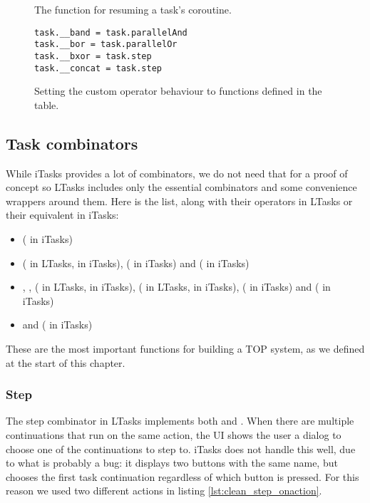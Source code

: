 \begin{figure}[ht]
\centering
\inputminted[linenos, firstline=310, lastline=327]{lua}{code/task.lua}
\vspace{-\baselineskip}
\caption{The  function for resuming a task's coroutine.}
\label{lst:ltasks_task.resume}
\end{figure}

\begin{figure}[ht]
\centering
\begin{verbatim}
task.__band = task.parallelAnd
task.__bor = task.parallelOr
task.__bxor = task.step
task.__concat = task.step
\end{verbatim}
\vspace{-\baselineskip}
\caption{Setting the custom operator behaviour to functions defined in the  table.}
\label{lst:ltasks_operators_definition}
\end{figure}

\subsection{Task combinators}\label{section-ltasks-combinators}
While iTasks provides a lot of combinators, we do not need that for a proof of concept so LTasks includes only the essential combinators and some convenience wrappers around them. Here is the list, along with their operators in LTasks or their equivalent in iTasks:
\begin{itemize}
    \item {} ( in iTasks)
    \item {} (\lua{~} in LTasks, \clean{>>*} in iTasks),  (\clean{>>-} in iTasks) and \linebreak {} ( in iTasks)
    \item {}, ,  (\lua{&} in LTasks, \clean{-&&-} in iTasks),  (\lua{|} in LTasks, \clean{-||-} in iTasks),  (\clean{-||} in iTasks) and  (\clean{||-} in iTasks)
    \item {} and  ( in iTasks)
\end{itemize}

These are the most important functions for building a TOP system, as we defined at the start of this chapter.

\subsubsection{Step}
The step combinator in LTasks implements both  and . When there are multiple continuations that run on the same action, the UI shows the user a dialog to choose one of the continuations to step to. iTasks does not handle this well, due to what is probably a bug: it displays two buttons with the same name, but chooses the first task continuation regardless of which button is pressed. For this reason we used two different actions in listing \ref{lst:clean_step_onaction}.

